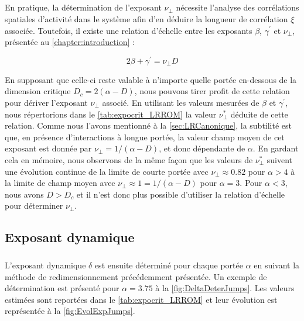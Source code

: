 \subparagraph{}En pratique, la détermination de l'exposant $\nu_\perp$ nécessite l'analyse des corrélations spatiales d'activité dans le système afin d'en déduire la longueur de corrélation $\xi$ associée. Toutefois, il existe une relation d'échelle entre les exposants $\beta$, $\gamma^\prime$ et $\nu_\perp$, présentée au \autoref{chapter:introduction} :

\begin{equation}
	2\beta + \gamma^\prime = \nu_\perp D
	\label{eq:HyperScaling}
\end{equation}

\noindent En supposant que celle-ci reste valable à n'importe quelle portée en-dessous de la dimension critique $D_c = 2(\alpha-D)$, nous pouvons tirer profit de cette relation pour dériver l'exposant $\nu_\perp$ associé. En utilisant les valeurs mesurées de $\beta$ et $\gamma^\prime$, nous répertorions dans le \autoref{tab:expocrit_LRROM} la valeur $\nu_\perp^*$ déduite de cette relation. Comme nous l'avons mentionné à la \autoref{sec:LRCanonique}, la subtilité est que, en présence d'interactions à longue portée, la valeur champ moyen de cet exposant est donnée par $\nu_\perp = 1/(\alpha-D)$, et donc dépendante de $\alpha$. En gardant cela en mémoire, nous observons de la même façon que les valeurs de $\nu_\perp^*$ suivent une évolution continue de la limite de courte portée avec $\nu_\perp \approx 0.82$ pour $\alpha>4$ à la limite de champ moyen avec $\nu_\perp\approx 1 = 1/(\alpha-D)$ pour $\alpha=3$. Pour $\alpha < 3$, nous avons $D>D_c$ et il n'est donc plus possible d'utiliser la relation d'échelle pour déterminer $\nu_\perp$. 


\subsection{Exposant dynamique}

\label{sec:expdynjump}

\subparagraph{}L'exposant dynamique $\delta$ est ensuite déterminé pour chaque portée $\alpha$ en suivant la méthode de redimensionnement précédemment présentée. Un exemple de détermination est présenté pour $\alpha = 3.75$ à la \autoref{fig:DeltaDeterJumps}. Les valeurs estimées sont reportées dans le \autoref{tab:expocrit_LRROM} et leur évolution est représentée à la \autoref{fig:EvolExpJumps}.

